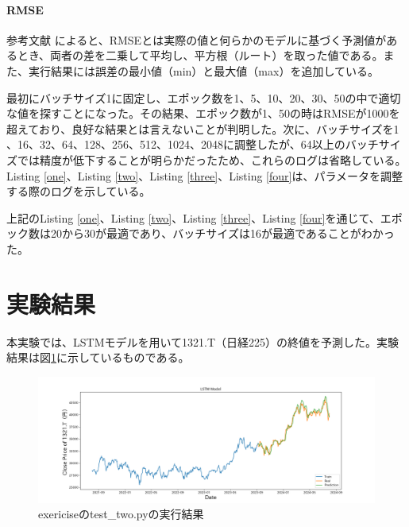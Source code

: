 \documentclass[a4paper, 11pt, titlepage]{jsarticle}
\begin{document}
\paragraph{RMSE}
\indent 参考文献 \cite{RMSD}によると、RMSEとは実際の値と何らかのモデルに基づく予測値があるとき、両者の差を二乗して平均し、平方根（ルート）を取った値である。また、実行結果には誤差の最小値（min）と最大値（max）を追加している。

\indent 最初にバッチサイズ1に固定し、エポック数を1、5、10、20、30、50の中で適切な値を探すことになった。その結果、エポック数が1、50の時はRMSEが1000を超えており、良好な結果とは言えないことが判明した。次に、バッチサイズを1 、16、32、64、128、256、512、1024、2048に調整したが、64以上のバッチサイズでは精度が低下することが明らかだったため、これらのログは省略している。\\
\indent Listing \ref{one}、Listing \ref{two}、Listing \ref{three}、Listing \ref{four}は、パラメータを調整する際のログを示している。





\indent 上記のListing \ref{one}、Listing \ref{two}、Listing \ref{three}、Listing \ref{four}を通じて、エポック数は20から30が最適であり、バッチサイズは16が最適であることがわかった。
\section{実験結果}
\indent 本実験では、LSTMモデルを用いて1321.T（日経225）の終値を予測した。実験結果は図\ref{twopython}に示しているものである。
\begin{figure}[htbp]
  \centering
  \includegraphics[width=120mm]{./exericise/image/lstm_model.png}
  \caption{exericiseのtest\_two.pyの実行結果}
  \label{twopython}
\end{figure}
\end{document}
